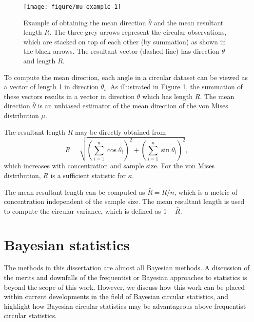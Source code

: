 \documentclass[12pt, a4paper]{book}\usepackage[]{graphicx}\usepackage[]{color}
\newenvironment{knitrout}{}{} %
\begin{document}
\begin{figure}
\centering
\begin{knitrout}
\color{fgcolor}
\texttt{[image: figure/mu\_example-1]} 

\end{knitrout}
\caption{Example of obtaining the mean direction $\bar{\theta}$ and the mean resultant length $R$. The three grey arrows represent the circular observations, which are stacked on top of each other (by summation) as shown in the black arrows. The resultant vector (dashed line) has direction $\bar{\theta}$ and length $R$.}\label{exampleRMu}
\end{figure}

To compute the mean direction, each angle in a circular dataset can be viewed as a vector of length 1 in direction $\theta_i$. As illustrated in Figure \ref{exampleRMu}, the summation of these vectors results in a vector in direction $\bar{\theta}$ which has length $R$. The mean direction $\bar{\theta}$ is an unbiased estimator of the mean direction of the von Mises distribution $\mu$.

The resultant length $R$ may be directly obtained from
$$ R = \sqrt{\left(\sum_{i=1}^{n} \cos \theta_i \right)^2 + \left(\sum_{i=1}^{n} \sin \theta_i \right)^2},$$
which increases with concentration and sample size. For the von Mises distribution, $R$ is a sufficient statistic for $\kappa$.

The mean resultant length can be computed as $\bar{R} = R/n$, which is a metric of concentration independent of the sample size. The mean resultant length is used to compute the circular variance, which is defined as $1 - \bar{R}.$





\section*{Bayesian statistics}

The methods in this dissertation are almost all Bayesian methods. A discussion of the merits and downfalls of the frequentist or Bayesian approaches to statistics is beyond the scope of this work. However, we discuss how this work can be placed within current developments in the field of Bayesian circular statistics, and highlight how Bayesian circular statistics may be advantageous above frequentist circular statistics.
\end{document}
